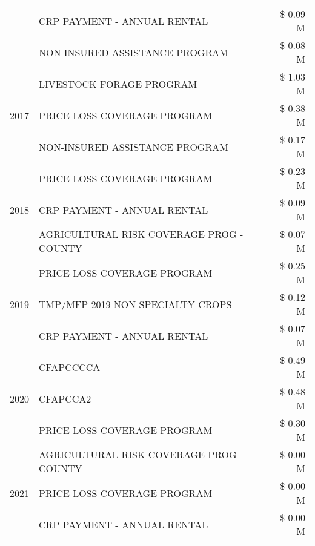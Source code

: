 \begin{tabular}{llr}
 & CRP PAYMENT - ANNUAL RENTAL                   & \$ 0.09 M \\
 & NON-INSURED ASSISTANCE PROGRAM                & \$ 0.08 M \\
\cline{1-3}
\multirow[t]{3}{*}{2017} & LIVESTOCK FORAGE PROGRAM & \$ 1.03 M \\
 & PRICE LOSS COVERAGE PROGRAM & \$ 0.38 M \\
 & NON-INSURED ASSISTANCE PROGRAM & \$ 0.17 M \\
\cline{1-3}
\multirow[t]{3}{*}{2018} & PRICE LOSS COVERAGE PROGRAM & \$ 0.23 M \\
 & CRP PAYMENT - ANNUAL RENTAL & \$ 0.09 M \\
 & AGRICULTURAL RISK COVERAGE PROG - COUNTY & \$ 0.07 M \\
\cline{1-3}
\multirow[t]{3}{*}{2019} & PRICE LOSS COVERAGE PROGRAM & \$ 0.25 M \\
 & TMP/MFP 2019 NON SPECIALTY CROPS & \$ 0.12 M \\
 & CRP PAYMENT - ANNUAL RENTAL & \$ 0.07 M \\
\cline{1-3}
\multirow[t]{3}{*}{2020} & CFAPCCCCA & \$ 0.49 M \\
 & CFAPCCA2 & \$ 0.48 M \\
 & PRICE LOSS COVERAGE PROGRAM & \$ 0.30 M \\
\cline{1-3}
\multirow[t]{3}{*}{2021} & AGRICULTURAL RISK COVERAGE PROG - COUNTY & \$ 0.00 M \\
 & PRICE LOSS COVERAGE PROGRAM & \$ 0.00 M \\
 & CRP PAYMENT - ANNUAL RENTAL & \$ 0.00 M \\
\cline{1-3}
\bottomrule
\end{tabular}
